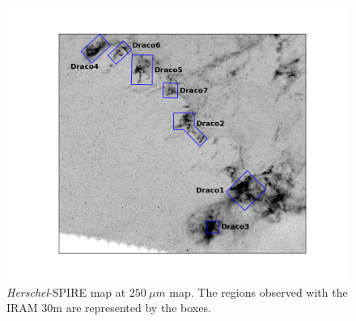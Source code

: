 \documentclass[traditabstract]{aa}
\begin{document}
%

\begin{figure}[h!]
  \centering
  \includegraphics[width=0.7\linewidth,trim=165 85 135 85,clip=true]{Figures/Draco_overview.png}
  \caption{\label{overview} \emph{Herschel}-SPIRE map at $250\: \mu m$ map. The regions observed with the IRAM 30m are represented 
by the boxes.}
\end{figure}
\end{document}
